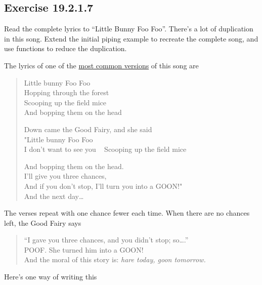 \documentclass[]{book}
\theoremstyle{plain}
\theoremstyle{remark}
\begin{document}
\hypertarget{exercise-19.2.1.7}{%
\subsection*{\texorpdfstring{Exercise
{19.2.1.7}}{Exercise 19.2.1.7}}\label{exercise-19.2.1.7}}

Read the complete lyrics to ``Little Bunny Foo Foo''. There's a lot of
duplication in this song. Extend the initial piping example to recreate
the complete song, and use functions to reduce the duplication.

The lyrics of one of the
\href{https://en.wikipedia.org/wiki/Little_Bunny_Foo_Foo}{most common
versions} of this song are

\begin{quote}
Little bunny Foo Foo\\
Hopping through the forest\\
Scooping up the field mice\\
And bopping them on the head

Down came the Good Fairy, and she said\\
"Little bunny Foo Foo\\
I don't want to see you ~ Scooping up the field mice

And bopping them on the head.\\
I'll give you three chances,\\
And if you don't stop, I'll turn you into a GOON!"\\
And the next day\ldots{}
\end{quote}

The verses repeat with one chance fewer each time. When there are no
chances left, the Good Fairy says

\begin{quote}
``I gave you three chances, and you didn't stop; so\ldots{}.''\\
POOF. She turned him into a GOON!\\
And the moral of this story is: \emph{hare today, goon tomorrow.}
\end{quote}

Here's one way of writing this
\end{document}
